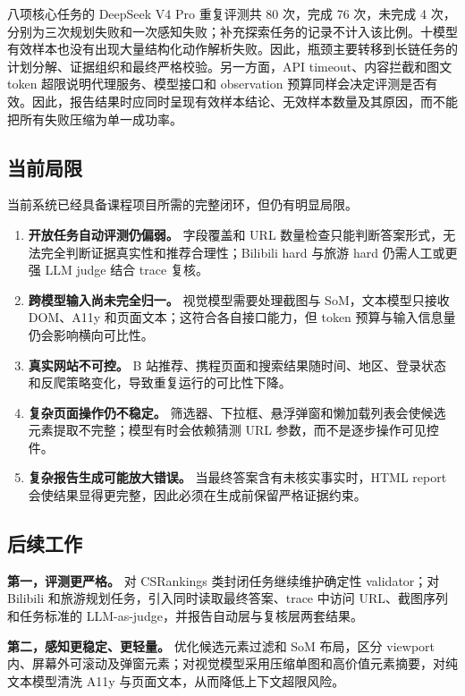 八项核心任务的 DeepSeek V4 Pro 重复评测共 80 次，完成 76 次，未完成 4 次，分别为三次规划失败和一次感知失败；补充探索任务的记录不计入该比例。十模型有效样本也没有出现大量结构化动作解析失败。因此，瓶颈主要转移到长链任务的计划分解、证据组织和最终严格校验。另一方面，API timeout、内容拦截和图文 token 超限说明代理服务、模型接口和 observation 预算同样会决定评测是否有效。因此，报告结果时应同时呈现有效样本结论、无效样本数量及其原因，而不能把所有失败压缩为单一成功率。

\subsection{当前局限}

当前系统已经具备课程项目所需的完整闭环，但仍有明显局限。
\begin{enumerate}
  \item \textbf{开放任务自动评测仍偏弱。} 字段覆盖和 URL 数量检查只能判断答案形式，无法完全判断证据真实性和推荐合理性；Bilibili hard 与旅游 hard 仍需人工或更强 LLM judge 结合 trace 复核。
  \item \textbf{跨模型输入尚未完全归一。} 视觉模型需要处理截图与 SoM，文本模型只接收 DOM、A11y 和页面文本；这符合各自接口能力，但 token 预算与输入信息量仍会影响横向可比性。
  \item \textbf{真实网站不可控。} B 站推荐、携程页面和搜索结果随时间、地区、登录状态和反爬策略变化，导致重复运行的可比性下降。
  \item \textbf{复杂页面操作仍不稳定。} 筛选器、下拉框、悬浮弹窗和懒加载列表会使候选元素提取不完整；模型有时会依赖猜测 URL 参数，而不是逐步操作可见控件。
  \item \textbf{复杂报告生成可能放大错误。} 当最终答案含有未核实事实时，HTML report 会使结果显得更完整，因此必须在生成前保留严格证据约束。
\end{enumerate}

\subsection{后续工作}

\textbf{第一，评测更严格。} 对 CSRankings 类封闭任务继续维护确定性 validator；对 Bilibili 和旅游规划任务，引入同时读取最终答案、trace 中访问 URL、截图序列和任务标准的 LLM-as-judge，并报告自动层与复核层两套结果。

\textbf{第二，感知更稳定、更轻量。} 优化候选元素过滤和 SoM 布局，区分 viewport 内、屏幕外可滚动及弹窗元素；对视觉模型采用压缩单图和高价值元素摘要，对纯文本模型清洗 A11y 与页面文本，从而降低上下文超限风险。


